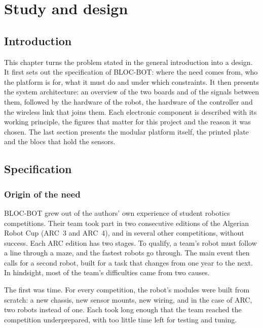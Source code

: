 
\chapter{Study and design}
\label{ch:design}

\section{Introduction}
This chapter turns the problem stated in the general introduction into a design. It
first sets out the specification of BLOC-BOT: where the need comes from, who the platform
is for, what it must do and under which constraints. It then presents the system
architecture: an overview of the two boards and of the signals between them, followed by
the hardware of the robot, the hardware of the controller and the wireless link that
joins them. Each electronic component is described with its working principle, the
figures that matter for this project and the reason it was chosen. The last section
presents the modular platform itself, the printed plate and the blocs that hold the
sensors.

\section{Specification}
\label{sec:spec}

\subsection{Origin of the need}
BLOC-BOT grew out of the authors' own experience of student robotics competitions. Their
team took part in two consecutive editions of the Algerian Robot Cup (ARC~3 and ARC~4), and in
several other competitions, without success. Each ARC edition has two stages. To
qualify, a team's robot must follow a line through a maze, and the fastest robots go
through. The main event then calls for a second robot, built for a task that changes
from one year to the next. In hindsight, most of the team's difficulties came from two
causes.

The first was time. For every competition, the robot's modules were built from scratch:
a new chassis, new sensor mounts, new wiring, and in the case of ARC, two robots instead
of one. Each took long enough that the team reached the competition underprepared, with
too little time left for testing and tuning.

